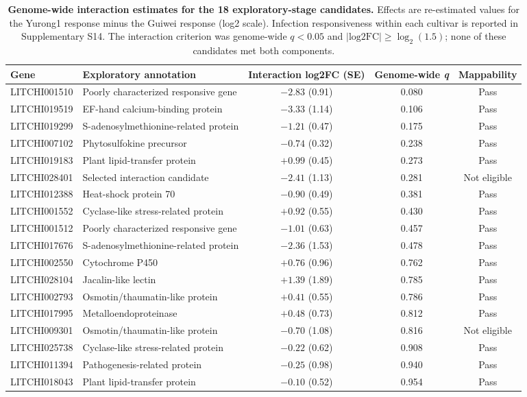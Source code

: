 \documentclass[referee,pdflatex,sn-basic,Numbered]{sn-jnl}
\newcommand{\q}{\textit{q}}
\begin{document}
\begin{table}[htbp]
\centering
\caption{\textbf{Genome-wide interaction estimates for the 18 exploratory-stage candidates.} Effects are re-estimated values for the Yurong1 response minus the Guiwei response (log2 scale). Infection responsiveness within each cultivar is reported in Supplementary S14. The interaction criterion was genome-wide $\q<0.05$ and $|\mathrm{log2FC}|\ge\log_2(1.5)$; none of these candidates met both components.}
\label{tab:legacy}
\footnotesize
\begin{tabular}{@{}llccc@{}}
\toprule
\textbf{Gene} & \textbf{Exploratory annotation} & \textbf{Interaction log2FC (SE)} & \textbf{Genome-wide \q} & \textbf{Mappability} \\
\midrule
LITCHI001510 & Poorly characterized responsive gene & $-2.83$ (0.91) & 0.080 & Pass \\
LITCHI019519 & EF-hand calcium-binding protein & $-3.33$ (1.14) & 0.106 & Pass \\
LITCHI019299 & S-adenosylmethionine-related protein & $-1.21$ (0.47) & 0.175 & Pass \\
LITCHI007102 & Phytosulfokine precursor & $-0.74$ (0.32) & 0.238 & Pass \\
LITCHI019183 & Plant lipid-transfer protein & $+0.99$ (0.45) & 0.273 & Pass \\
LITCHI028401 & Selected interaction candidate & $-2.41$ (1.13) & 0.281 & Not eligible \\
LITCHI012388 & Heat-shock protein 70 & $-0.90$ (0.49) & 0.381 & Pass \\
LITCHI001552 & Cyclase-like stress-related protein & $+0.92$ (0.55) & 0.430 & Pass \\
LITCHI001512 & Poorly characterized responsive gene & $-1.01$ (0.63) & 0.457 & Pass \\
LITCHI017676 & S-adenosylmethionine-related protein & $-2.36$ (1.53) & 0.478 & Pass \\
LITCHI002550 & Cytochrome P450 & $+0.76$ (0.96) & 0.762 & Pass \\
LITCHI028104 & Jacalin-like lectin & $+1.39$ (1.89) & 0.785 & Pass \\
LITCHI002793 & Osmotin/thaumatin-like protein & $+0.41$ (0.55) & 0.786 & Pass \\
LITCHI017995 & Metalloendoproteinase & $+0.48$ (0.73) & 0.812 & Pass \\
LITCHI009301 & Osmotin/thaumatin-like protein & $-0.70$ (1.08) & 0.816 & Not eligible \\
LITCHI025738 & Cyclase-like stress-related protein & $-0.22$ (0.62) & 0.908 & Pass \\
LITCHI011394 & Pathogenesis-related protein & $-0.25$ (0.98) & 0.940 & Pass \\
LITCHI018043 & Plant lipid-transfer protein & $-0.10$ (0.52) & 0.954 & Pass \\
\bottomrule
\end{tabular}
\end{table}
\end{document}
